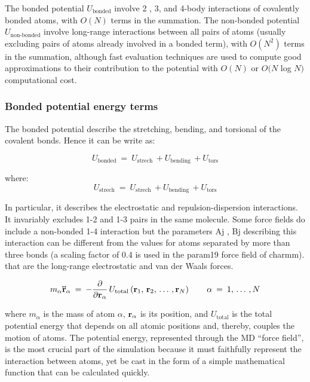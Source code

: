 The bonded potential $U_{\text{bonded}}$ involve 2 , 3, and 4-body interactions of covalently bonded atoms, with $O(N)$ terms in the summation. The non-bonded potential $U_{\text{non-bonded}}$ involve long-range interactions between all pairs of atoms (usually excluding pairs of atoms already involved in a bonded term), with $O(N^2)$ terms in the summation, although fast evaluation techniques are used to compute good approximations to their contribution to the potential with $O(N)$ or $O(N$ log $N )$ computational cost.

\subsubsection{Bonded potential energy terms}
The bonded potential describe the stretching, bending, and torsional of the covalent bonds. Hence it can be write as:

\begin{equation}\label{eq:NAMD-PotEnergy}
U_{\text{bonded}} \: = \: U_{\text{strech}} \, + U_{\text{bending}} \, + U_{\text{tors}}
\end{equation}

where:
\begin{equation}\label{eq:NAMD-PotEnergy}
U_{\text{strech}} \: = \: U_{\text{strech}} \, + U_{\text{bending}} \, + U_{\text{tors}}
\end{equation}

 In particular, it describes the electrostatic and repulsion-dispersion interactions. It invariably excludes 1-2 and 1-3 pairs in the same molecule. Some force fields do include a non-bonded 1-4 interaction but the parameters Aj , Bj describing this interaction can be different from the values for atoms separated by more than three bonds (a scaling factor of 0.4 is used in the param19 force field of charmm).
 that are the long-range electrostatic and van der Waals forces.
 
\begin{equation}\label{eq:Newton-law}
m_\alpha \bold{\ddot{r}}_\alpha \: = \: - \frac{\partial}{\partial \bold{r}_\alpha} \, U_{\text{total}} \left( \bold{r}_1 , \, \bold{r}_2 , \, \dots \, , \bold{r}_N \right)
\quad\quad \alpha \: = \: 1 , \, \dots \, , N
\end{equation}

where $m_\alpha$ is the mass of atom $\alpha$, $\bold{r}_\alpha$ is its position, and $U_{\text{total}}$ is the total potential energy that depends on all atomic positions and, thereby, couples the motion of atoms. The potential energy, represented through the MD ``force field'', is the most crucial part of the simulation because it must faithfully represent the interaction between atoms, yet be cast in the form of a simple mathematical function that can be calculated quickly.

